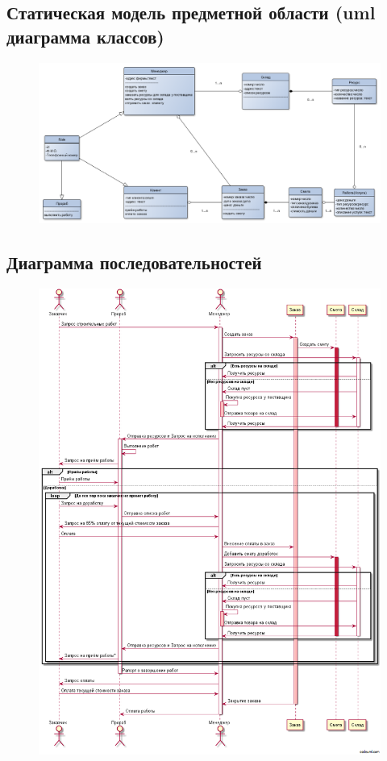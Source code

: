 \documentclass[12pt,a4paper,titlepage]{article}
\begin{document}
\subsection{Статическая модель предметной области (uml диаграмма классов)} 
\begin{figure}[!ht]
\includegraphics[scale=0.3]{uml_class_diagram.png}\caption{}
\end{figure}
\newpage
\subsection{Диаграмма последовательностей}
\begin{figure}[!ht]
\includegraphics[scale=0.5]{getimage.png}\caption{}
\end{figure}
\newpage
\end{document}
